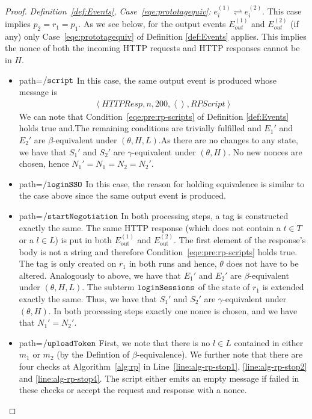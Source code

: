 \begin{theorem}
\begin{proof}
    \noindent \emph{Definition~\ref{def:Events}, Case~\ref{eqe:prototagequiv}:}
    $e_i^{(1)}\rightleftharpoons e_i^{(2)}$. This case implies 
    $p_2=r_1=p_1$. As we see below, for the output events 
    $E_{out}^{(1)}$ and $E_{out}^{(2)}$ (if any) only 
    Case~\ref{eqe:prototagequiv} of Definition \ref{def:Events} 
    applies. This implies the nonce of both the incoming HTTP 
    requests and HTTP responses cannot be in $H$.
    \begin{itemize}
      \item path=$\mathtt{/script}$ 
        In this case, the same output 
        event is produced whose message is 
        \begin{equation}
          \begin{aligned}
            \left\langle HTTPResp,n,200,\left\langle\right\rangle,RPScript\right\rangle
          \end{aligned}
        \end{equation}
        We can note that Condition~\ref{eqe:pre:rp-scripts} of 
        Definition \ref{def:Events} 
        holds true and.The remaining conditions are trivially 
        fulfilled and $E_1\prime$ and $E_2\prime$ are 
        $\beta$-equivalent under $(\theta,H,L)$.As there are no 
        changes to any state, we have that $S_1\prime$ and 
        $S_2\prime$ are $\gamma$-equivalent under $(\theta,H)$. 
        No new nonces are chosen, hence $N_1\prime=N_1=N_2=N_2\prime$.
      \item path=$\mathtt{/loginSSO}$ 
        In this case, the reason for holding equivalence is 
        similar to the case above since the same output event 
        is produced.
      \item path=$\mathtt{/startNegotiation}$ 
        In both processing steps, a tag is constructed exactly 
        the same. The same HTTP response (which does not contain 
        a $t \in T$ or a $l \in L$) is put in both 
        $E^{(1)}_\text{out}$ and $E^{(2)}_\text{out}$. The first 
        element of the response's body is not a string and 
        therefore Condition~\ref{eqe:pre:rp-scripts} holds true. 
        The tag is only created on $r_1$ in both runs and hence, 
        $\theta$ does not have to be altered. 
        Analogously to above, we have that $E_1'$ and $E_2'$ are 
        $\beta$-equivalent under $(\theta,H,L)$. The subterm 
        $\mathtt{loginSessions}$ of the state of $r_1$ is extended 
        exactly the same. Thus, we have that $S_1'$ and $S_2'$ 
        are $\gamma$-equivalent under $(\theta,H)$. In both
        processing steps exactly one nonce is chosen, and we 
        have that $N_1' = N_2'$.
      \item path=$\mathtt{/uploadToken}$ 
        First, we note that there is no $l \in L$ contained in 
        either $m_1$ or $m_2$ (by the Defintion of 
        $\beta$-equivalence). We further note that there are 
        four checks at Algorithm~\ref{alg:rp} in
        Line~\ref{line:alg-rp-stop1}, %
        \ref{line:alg-rp-stop2} and \ref{line:alg-rp-stop4}.
        The script either emits an empty message if failed in
        these checks or accept the request and response with a 
        nonce.
  

\end{itemize}
\end{proof}
\end{theorem}
